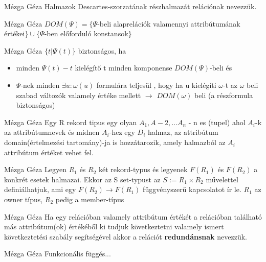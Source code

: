 \begin{definicio}{Mézga Géza}
Halmazok Descartes-szorzatának részhalmazát relációnak nevezzük.
\end{definicio}

\begin{definicio}{Mézga Géza}
$DOM(\Psi) = \lbrace \Psi$-beli alaprelációk valamennyi attribútumának értékei$\rbrace \cup \lbrace \Psi$-ben előforduló konstansok$ \rbrace$
\end{definicio}

\begin{definicio}{Mézga Géza}
$\lbrace t | \Psi(t) \rbrace$ biztonságos, ha
  \begin{itemize}
    \item minden $\Psi(t)-t$ kielégítő t minden komponense $DOM(\Psi)$-beli és
    \item $\Psi$-nek minden $\exists u : \omega(u)$ formulára teljesül , hogy ha u kielégíti $\omega$-t  az $\omega$ beli szabad változók valamely értéke mellett $\longrightarrow$ $DOM(\omega)$ beli (a részformula biztonságos)
  \end{itemize}
\end{definicio}

\begin{definicio}{Mézga Géza}
Egy R rekord tipus egy olyan $A_1, A-2, \ldots A_n$ - n es (tupel) ahol $A_i$-k az attribútumnevek és midnen $A_i$-hez egy $D_i$ halmaz, az attribútum domain(értelmezési tartomány)-ja is hozzátarozik, amely halmazból az $A_i$ attribútum értéket vehet fel.
\end{definicio}

\begin{definicio}{Mézga Géza}
Legyen $R_1$ és $R_2$ két rekord-typus és legyenek $F(R_1)$ és $F(R_2)$ a konkrét esetek halmazai. Ekkor az S set-typust az $S:= R_1 \times R_2$ művelettel definiálhatjuk, ami egy $F(R_2)\rightarrow F(R_1)$ függvényszerű kapcsolatot ír le. $R_1$ az owner típus, $R_2$ pedig a member-típus
\end{definicio}

\begin{definicio}{Mézga Géza}
Ha egy relációban valamely attribútum értékét a relációban található más attribútum(ok) értékéből ki tudjuk következtetni valamely ismert következtetési szabály segítségével akkor a relációt \textbf{redundánsnak} nevezzük.
\end{definicio}

\begin{definicio}{Mézga Géza}
Funkcionális függés...
\end{definicio}


